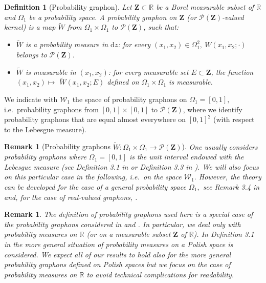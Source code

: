 \documentclass[11pt]{article}
\newtheorem{definition}[theorem]{Definition}
\newtheorem{remark}[theorem]{Remark}
\def\R{\mathbb{R}}
\newcommand{\cP}{{\mathcal P}}  %
\newcommand{\Space}{\mathbf{Z}}
\newcommand{\Graphon}{\mathcal{W}_1}
\begin{document}
\begin{definition}[Probability graphon]\label{DefProbGraphon}
Let $\Space\subset \R$ be a Borel measurable subset of $\R$ and $\Omega_1$ be a probability space. A \emph{probability graphon} on $\Space$ (or $\mathcal{P}(\Space)$-valued kernel) is a map $\widetilde W$ from $\Omega_1\times \Omega_1$ to $\mathcal{P}(\Space)$, such that:
\begin{itemize}
    \item $\widetilde W$ is a probability measure in $\mathrm{d} z$: for every $(x_1, x_2) \in \Omega_1^2, \ W(x_1, x_2 ; \cdot)$ belongs to $\mathcal{P}(\Space)$.
    \item $\widetilde W$ is measurable in $(x_1, x_2)$: for every measurable set $E \subset \Space$, the function $(x_1, x_2) \mapsto$ $\widetilde W(x_1, x_2 ; E)$ defined on $\Omega_1\times \Omega_1$ is measurable.
\end{itemize} 
\end{definition}
We indicate with  $\Graphon$ the space of probability graphons on $\Omega_1=[0,1],$ i.e.\ probability graphons from $[0,1]\times [0,1]$ to $\mathcal{P}(\Space)$, where we identify probability graphons that are  equal almost everywhere on $[0,1]^2$ (with respect to the Lebesgue measure).  

\begin{remark}[Probability graphons $\widetilde W : \Omega_1\times \Omega_1 \to \cP(\Space)$]
One usually considers probability graphons where $\Omega_1=[0,1]$ is the unit interval endowed with the Lebesgue measure (see Definition 3.1 in \cite{abraham2023probabilitygraphons} or Definition 3.3 in \cite{zucal2024probabilitygraphonsrightconvergence}). We will also focus on this particular case in the following, i.e.\ on the space $\Graphon.$ However, the theory can be developed for the case of a general probability space $\Omega_1,$ see Remark 3.4 in \cite{abraham2023probabilitygraphons} and, for the case of real-valued graphons, \cite{jansonGraphonsCutNorm2013}.  
\end{remark}

\begin{remark}\label{RemarkgeneralCasePolish}
The definition of probability graphons used here is a special case of the probability graphons considered in \cite{abraham2023probabilitygraphons} and \cite{zucal2024probabilitygraphonsrightconvergence}. In particular, we deal only with probability measures on $\R$ (or on a measurable subset $\Space$ of $\R$). In Definition 3.1 in \cite{abraham2023probabilitygraphons} the more general situation of probability measures on a Polish space is considered. We expect all of our results to hold also for the more general probability graphons defined on Polish spaces but we focus on the case of probability measures on $\R$ to avoid technical complications for readability.
\end{remark}
\end{document}
